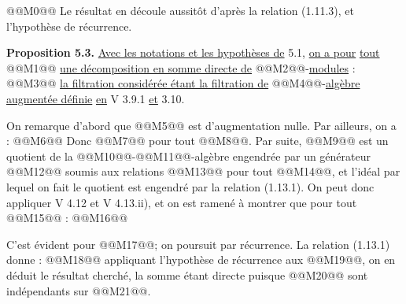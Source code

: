 
@@M0@@
Le
résultat en découle aussitôt d'après la relation (1.11.3), et l'hypothèse de récurrence.

\textbf{Proposition 5.3.} \uline{Avec les notations et les hypothèses de} 5.1, \uline{on a pour} \uline{tout} @@M1@@ \uline{une décomposition en somme directe de} @@M2@@-\uline{modules} :
@@M3@@
\uline{la filtration considérée étant la filtration de} @@M4@@-\uline{algèbre augmentée définie} \uline{en} V 3.9.1 \uline{et} 3.10.

On remarque d'abord que @@M5@@ est d'augmentation nulle. Par ailleurs, on a :
@@M6@@
Donc @@M7@@ pour tout @@M8@@. Par suite, @@M9@@ est un quotient de la @@M10@@-@@M11@@-algèbre engendrée par un générateur @@M12@@ soumis aux relations @@M13@@ pour tout @@M14@@, et l'idéal par lequel on fait le quotient est engendré par la relation (1.13.1). On peut donc appliquer V 4.12 et V 4.13.ii), et on est ramené à montrer que pour tout @@M15@@ :
@@M16@@

C'est évident pour @@M17@@; on poursuit par récurrence. La relation (1.13.1) donne :
@@M18@@
appliquant l'hypothèse de récurrence aux @@M19@@, on en déduit le résultat cherché, la somme étant directe puisque @@M20@@ sont indépendants sur @@M21@@.

